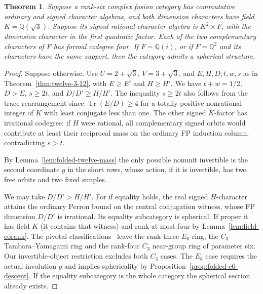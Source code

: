 \documentclass[11pt,reqno]{amsart}
\newtheorem{theorem}{Theorem}[section]
\theoremstyle{remark}\newtheorem{remark}[theorem]{Remark}
\numberwithin{equation}{section}
\begin{document}
\begin{theorem}\label{thm:folded-twelve-completion}
Suppose a rank-six complex fusion category has commutative ordinary and signed character algebras, and both dimension characters have field $K=\mathbb Q(\sqrt3)$. Suppose its signed rational character algebra is $K^2\times F$, with the dimension character in the first quadratic factor. Each of the two complementary characters of $F$ has formal codegree four. If $F=\mathbb Q(i)$, or if $F=\mathbb Q^2$ and its characters have the same support, then the category admits a spherical structure.
\end{theorem}
\begin{proof}
Suppose otherwise. Use $U=2+\sqrt3$, $V=3+\sqrt3$, and $E,H,D,t,w,s$ as in Theorem~\ref{thm:twelve-3-12}, with $E\ge E'$ and $H\ge H'$. We have $t+w=1/2$, $D>E$, $s\ge2t$, and $D/D'\ge H/H'$. The inequality $s\ge2t$ also follows from the trace rearrangement since $\operatorname{Tr}(E/D)\ge4$ for a totally positive nonrational integer of $K$ with least conjugate less than one. The other signed $K$-factor has irrational codegree: if $H$ were rational, all complementary signed orbits would contribute at least their reciprocal mass on the ordinary FP induction column, contradicting $s>t$.

By Lemma~\ref{lem:folded-twelve-mass} the only possible nonunit invertible is the second coordinate $g$ in the short rows, whose action, if it is invertible, has two free orbits and two fixed simples.

We may take $D/D'>H/H'$. For if equality holds, the real signed $H$-character attains the ordinary Perron bound on the central conjugation witness, whose FP dimension $D/D'$ is irrational. Its equality subcategory is spherical. If proper it has field $K$ (it contains that witness) and rank
at most four by Lemma~\ref{lem:field-corank}. The pivotal
classifications~\cite{Ostrik2,Ostrik3,DPP} leave the rank-three $E_6$ ring, the $C_3$ Tambara--Yamagami ring and the rank-four $C_3$ near-group ring of parameter six. Our invertible-object restriction excludes both $C_3$ cases. The $E_6$ case requires the actual involution $g$ and implies sphericality by Proposition~\ref{prop:folded-e6-descent}. If the equality subcategory is the whole category the spherical section already exists.


\end{proof}
\end{document}
